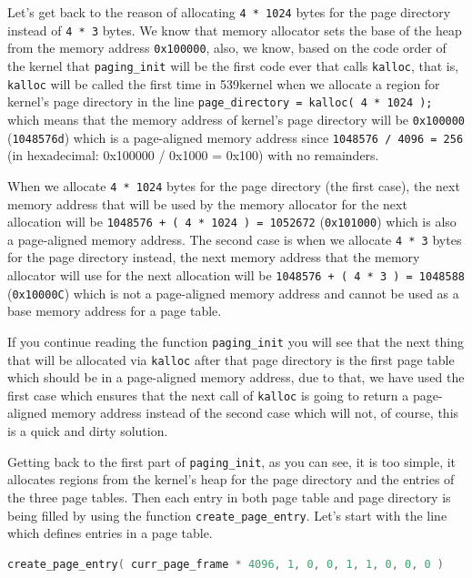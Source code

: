 Let's get back to the reason of allocating \lstinline!4 * 1024! bytes
for the page directory instead of \lstinline!4 * 3! bytes. We know that
memory allocator sets the base of the heap from the memory address
\lstinline!0x100000!, also, we know, based on the code order of the
kernel that \lstinline!paging_init! will be the first code ever that
calls \lstinline!kalloc!, that is, \lstinline!kalloc! will be called the
first time in 539kernel when we allocate a region for kernel's page
directory in the line \lstinline!page_directory = kalloc( 4 * 1024 );!
which means that the memory address of kernel's page directory will be
\lstinline!0x100000! (\lstinline!1048576d!) which is a page-aligned
memory address since \lstinline!1048576 / 4096 = 256! (in hexadecimal:
0x100000 / 0x1000 = 0x100) with no remainders.

When we allocate \lstinline!4 * 1024! bytes for the page directory (the
first case), the next memory address that will be used by the memory
allocator for the next allocation will be
\lstinline!1048576 + ( 4 * 1024 ) = 1052672! (\lstinline!0x101000!)
which is also a page-aligned memory address. The second case is when we
allocate \lstinline!4 * 3! bytes for the page directory instead, the
next memory address that the memory allocator will use for the next
allocation will be \lstinline!1048576 + ( 4 * 3 ) = 1048588!
(\lstinline!0x10000C!) which is not a page-aligned memory address and
cannot be used as a base memory address for a page table.

If you continue reading the function \lstinline!paging_init! you will
see that the next thing that will be allocated via \lstinline!kalloc!
after that page directory is the first page table which should be in a
page-aligned memory address, due to that, we have used the first case
which ensures that the next call of \lstinline!kalloc! is going to
return a page-aligned memory address instead of the second case which
will not, of course, this is a quick and dirty solution.

Getting back to the first part of \lstinline!paging_init!, as you can
see, it is too simple, it allocates regions from the kernel's heap for
the page directory and the entries of the three page tables. Then each
entry in both page table and page directory is being filled by using the
function \lstinline!create_page_entry!. Let's start with the line which
defines entries in a page table.

\begin{lstlisting}[language=C]
create_page_entry( curr_page_frame * 4096, 1, 0, 0, 1, 1, 0, 0, 0 )
\end{lstlisting}

